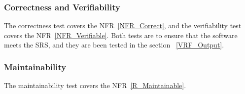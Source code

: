\documentclass[12pt, titlepage]{article}
\newcounter{reqnum} %
\begin{document}
\begin{comment}
\noindent \begin{itemize}

\item[NFR\refstepcounter{reqnum}\thereqnum \label{NFR_Correct}:] 
The outputs of the code have the properties described in section 
\item[NFR\refstepcounter{reqnum}\thereqnum \label{NFR_Verifiable}:]  
The code is tested with complete verification and validation plan.
\item[NFR\refstepcounter{reqnum}\thereqnum \label{NFR_Reusable}:]
The code is modularized. 
\item[NFR\refstepcounter{reqnum}\thereqnum \label{NFR_Maintainable}:] The
  traceability between requirements, assumptions, theoretical models, general
  definitions, data definitions, instance models, likely changes, unlikely
  changes, and modules is completely recorded in traceability matrices in teh
  SRS and module guide.
\item[NFR\refstepcounter{reqnum}\thereqnum \label{NFR_Portable}:]
The code is able to be run in different environments. 
\end{itemize}

\begin{table}[H]
\caption{Output Variables} \label{TblOutputVar}
\renewcommand{\arraystretch}{1.2}
\noindent \begin{longtable*}{l l} 
  \toprule
  \textbf{Var} & \textbf{Physical Constraints} \\
  \midrule 
  ${\theta_1}''$ & ${\theta_1}'' \neq 0$\\
  ${\theta_2}''$ & ${\theta_2}'' \neq 0$\\
  \bottomrule
\end{longtable*}
\end{table}
\end{comment}
\subsubsection{Correctness and Verifiability}\label{CnV}
		
The correctness test covers the NFR~\ref{NFR_Correct}, and the verifiability
test covers the NFR~\ref{NFR_Verifiable}. Both tests are to ensure that the
software meets the SRS, and they are been tested in the section
~\ref{VRF_Output}.

\subsubsection{Maintainability}\label{MainTest}
The maintainability test covers the NFR~\ref{R_Maintainable}. 
\end{document}
